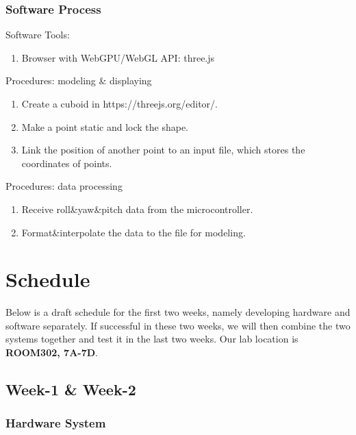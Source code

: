 \documentclass[11pt, a4paper]{article}
\begin{document}
\subsubsection{Software Process}
\noindent
Software Tools:
\begin{enumerate}
    \item Browser with WebGPU/WebGL API: three.js
\end{enumerate}
\noindent
Procedures: modeling \& displaying

\begin{enumerate}
    \item Create a cuboid in https://threejs.org/editor/.
    \item Make a point static and lock the shape.
    \item Link the position of another point to an input file, which stores the coordinates of points.
\end{enumerate}

\noindent
Procedures: data processing
\begin{enumerate}
	\item Receive roll\&yaw\&pitch data from the microcontroller.
	\item Format\&interpolate the data to the file for modeling.
\end{enumerate}

\newpage
\section{Schedule}
Below is a draft schedule for the first two weeks, namely developing hardware and software separately. If successful in these two weeks, we will then combine the two systems together and test it in the last two weeks. Our lab location is \textbf{ROOM302, 7A-7D}.
\subsection{Week-1 \& Week-2}


\subsubsection{Hardware System}
\end{document}
